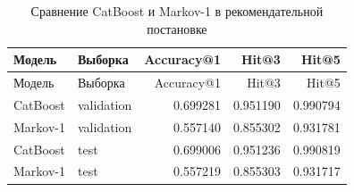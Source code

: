 \begin{center}
\small
\begin{longtable}{p{} p{} r r r}
\caption{Сравнение CatBoost и Markov-1 в рекомендательной постановке}
\label{tab:recommendation-metrics}\\
\toprule
Модель & Выборка & Accuracy@1 & Hit@3 & Hit@5 \\
\midrule
\endfirsthead

\toprule
Модель & Выборка & Accuracy@1 & Hit@3 & Hit@5 \\
\midrule
\endhead

\bottomrule
\endlastfoot

CatBoost & validation & 0.699281 & 0.951190 & 0.990794 \\
Markov-1 & validation & 0.557140 & 0.855302 & 0.931781 \\
CatBoost & test & 0.699006 & 0.951236 & 0.990819 \\
Markov-1 & test & 0.557219 & 0.855303 & 0.931717 \\

\end{longtable}
\end{center}
